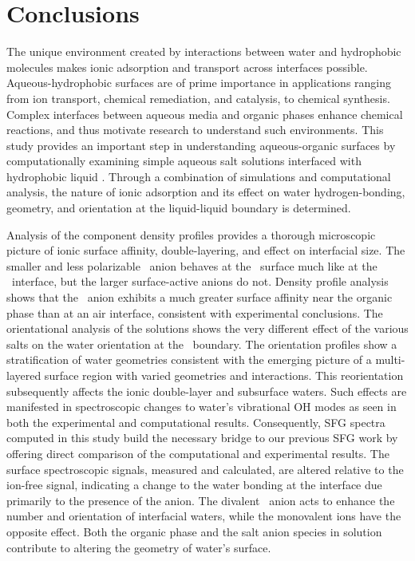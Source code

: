 \section{Conclusions}

The unique environment created by interactions between water and hydrophobic molecules makes ionic adsorption and transport across interfaces possible. Aqueous-hydrophobic surfaces are of prime importance in applications ranging from ion transport, chemical remediation, and catalysis, to chemical synthesis. Complex interfaces between aqueous media and organic phases enhance chemical reactions, and thus motivate research to understand such environments. This study provides an important step in understanding aqueous-organic surfaces by computationally examining simple aqueous salt solutions interfaced with hydrophobic liquid \ctc. Through a combination of simulations and computational analysis, the nature of ionic adsorption and its effect on water hydrogen-bonding, geometry, and orientation at the liquid-liquid boundary is determined.

Analysis of the component density profiles provides a thorough microscopic picture of ionic surface affinity, double-layering, and effect on interfacial size. The smaller and less polarizable \cl~anion behaves at the \ctcwat~surface much like at the \airwat~interface, but the larger surface-active anions do not. Density profile analysis shows that the \nit~anion exhibits a much greater surface affinity near the organic phase than at an air interface, consistent with experimental conclusions. The orientational analysis of the solutions shows the very different effect of the various salts on the water orientation at the \ctcwat~boundary. The orientation profiles show a stratification of water geometries consistent with the emerging picture of a multi-layered surface region with varied geometries and interactions. This reorientation subsequently affects the ionic double-layer and subsurface waters. Such effects are manifested in spectroscopic changes to water's vibrational OH modes as seen in both the experimental and computational results. Consequently, SFG spectra computed in this study build the necessary bridge to our previous SFG work by offering direct comparison of the computational and experimental results. The surface spectroscopic signals, measured and calculated, are altered relative to the ion-free signal, indicating a change to the water bonding at the interface due primarily to the presence of the anion. The divalent \sul~anion acts to enhance the number and orientation of interfacial waters, while the monovalent ions have the opposite effect. Both the organic phase and the salt anion species in solution contribute to altering the geometry of water's surface. 

